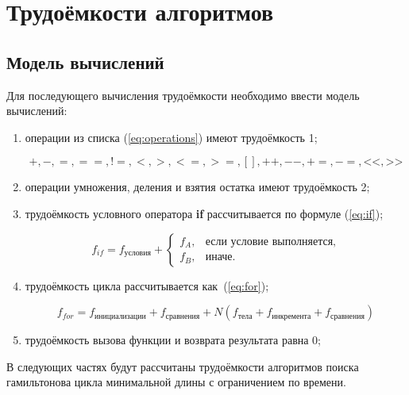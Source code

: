 \section{Трудоёмкости алгоритмов}

\subsection{Модель вычислений}

Для последующего вычисления трудоёмкости необходимо ввести модель вычислений:

\begin{enumerate}
	\item операции из списка (\ref{eq:operations}) имеют трудоёмкость 1;
	
	\begin{equation}
		\label{eq:operations}
		+, -, =, ==, !=, <, >, <=, >=, [], ++, {-}-, +=, -=, \text{<<}, \text{>>}
	\end{equation}
	
	\item операции умножения, деления и взятия остатка имеют трудоёмкость 2;
	
	\item трудоёмкость условного оператора \textbf{if} рассчитывается по формуле (\ref{eq:if});
	
	\begin{equation}
		\label{eq:if}
		f_{if} = f_{\text{условия}} +
		\begin{cases}
			f_A, & \text{если условие выполняется}, \\
			f_B, & \text{иначе}.
		\end{cases}
	\end{equation}
	
	\item трудоёмкость цикла рассчитывается как~(\ref{eq:for});
	
	\begin{equation}
		\label{eq:for}
		f_{for} = f_{\text{инициализации}} + f_{\text{сравнения}} + N(f_{\text{тела}} + f_{\text{инкремента}} + f_{\text{сравнения}})
	\end{equation}
	
	\item трудоёмкость вызова функции и возврата результата равна 0;
	
\end{enumerate}

В следующих частях будут рассчитаны трудоёмкости алгоритмов поиска гамильтонова цикла минимальной длины с ограничением по времени.

